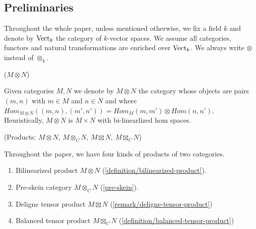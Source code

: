 



\subsection{Preliminaries}\label{subsection/preliminaries}

Throughout the whole paper, unless mentioned otherwise, we fix a field $k$ and
denote by $\operatorname{Vect}_k$ the category of $k$-vector spaces. We assume all
categories, functors and natural transformations are enriched over $\operatorname{Vect}_k$.
We always write $\otimes$ instead of $\otimes_k$.


\begin{definition} \label{definition/bilinearized-product} ($M \otimes N$)

\noindent
Given categories $M,N$ we denote by $M\otimes N$ the category whose objects
are pairs $(m,n)$ with $m\in M$ and $n\in N$ and where $Hom_{M\otimes
N}((m,n),(m',n'))=Hom_M(m,m')\otimes Hom(n,n')$. Heuristically, $M \otimes N$
is $M \times N$ with bi-linearlized hom spaces.
\end{definition}

\begin{remark} (Products: $M \otimes N$, $M \otimes_C N$, $M \boxtimes N$, $M \boxtimes_C N$)

  \noindent Throughout the paper, we have four kinds of products of two categories.
  \begin{enumerate}
    \item Bilinearized product $M \otimes N$ (\ref{definition/bilinearized-product}).
    \item Pre-skein category $M\otimes_C N$ (\ref{pre-skein}).
    \item Deligne tensor product $M \boxtimes N$ (\ref{remark/deligne-tensor-product})
    \item Balanced tensor product $M \boxtimes_C N$ (\ref{definition/balanced-tensor-product})
  \end{enumerate}
\end{remark}

